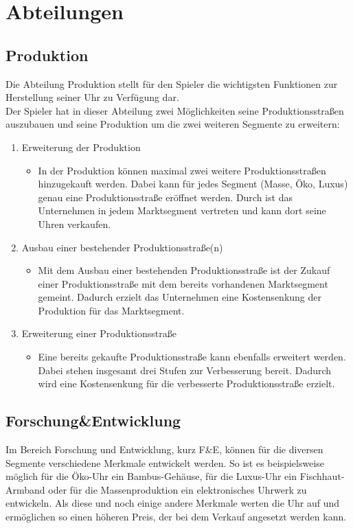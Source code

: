 \clearpage
\chapter{Abteilungen}
\section{Produktion}
Die Abteilung Produktion stellt für den Spieler die wichtigsten Funktionen zur Herstellung seiner Uhr zu Verfügung dar.\\ 
Der Spieler hat in dieser Abteilung zwei Möglichkeiten seine Produktionsstraßen auszubauen und seine Produktion um die zwei weiteren Segmente zu erweitern:
\begin{enumerate}
	\item Erweiterung der Produktion
\begin{itemize}
	\item In der Produktion können maximal zwei weitere Produktionsstraßen hinzugekauft werden. Dabei kann für jedes Segment (Masse, Öko, Luxus) genau eine Produktionsstraße eröffnet werden. Durch ist das Unternehmen in jedem Marktsegment vertreten und kann dort seine Uhren verkaufen.
\end{itemize}
	\item Ausbau einer bestehender Produktionsstraße(n)
\begin{itemize}
	\item Mit dem Ausbau einer bestehenden Produktionsstraße ist der Zukauf einer Produktionsstraße mit dem bereits vorhandenen Marktsegment gemeint. Dadurch erzielt das Unternehmen eine Kostensenkung der Produktion für das Marktsegment. 
\end{itemize}
	\item Erweiterung einer Produktionsstraße
\begin{itemize}
	\item Eine bereits gekaufte Produktionsstraße kann ebenfalls erweitert werden. Dabei stehen insgesamt drei Stufen zur Verbesserung bereit. Dadurch wird eine Kostensenkung für die verbesserte Produktionsstraße erzielt.   
\end{itemize}
\end{enumerate}
    
\section{Forschung\&Entwicklung}
Im Bereich Forschung und Entwicklung, kurz F\&E, können für die diversen Segmente verschiedene Merkmale entwickelt werden. So ist es beispielsweise möglich für die Öko-Uhr ein Bambus-Gehäuse, für die Luxus-Uhr ein Fischhaut-Armband oder für die Massenproduktion ein elektronisches Uhrwerk zu entwickeln. Als diese und noch einige andere Merkmale werten die Uhr auf und ermöglichen so einen höheren Preis, der bei dem Verkauf angesetzt werden kann.

